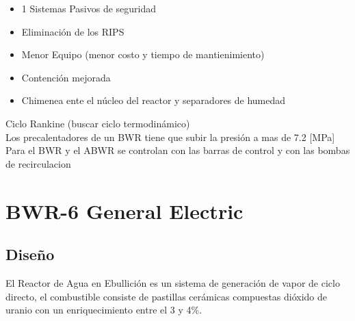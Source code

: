 \documentclass[]{article}
\begin{document}
\begin{multicols}{2}
\begin{itemize}
	\item 1 Sistemas Pasivos de seguridad
	\item Eliminación de los RIPS
	\item Menor Equipo (menor costo y tiempo de mantienimiento)
	\item Contención mejorada
	\item Chimenea ente el núcleo del reactor y separadores de humedad
\end{itemize}
\end{multicols}

Ciclo Rankine (buscar ciclo termodinámico)\\

Los precalentadores de un  BWR tiene que subir la presión a mas de 7.2 [MPa]\\

Para el BWR y el ABWR se controlan con las barras de control y 
con las bombas de recirculacion\\









\section{BWR-6 General Electric}

\subsection{Diseño}

El Reactor de Agua en Ebullición  es un sistema de generación de vapor de ciclo directo, el combustible  consiste de pastillas cerámicas compuestas dióxido de uranio con un enriquecimiento entre el 3 y 4$\%$.\\
\end{document}
